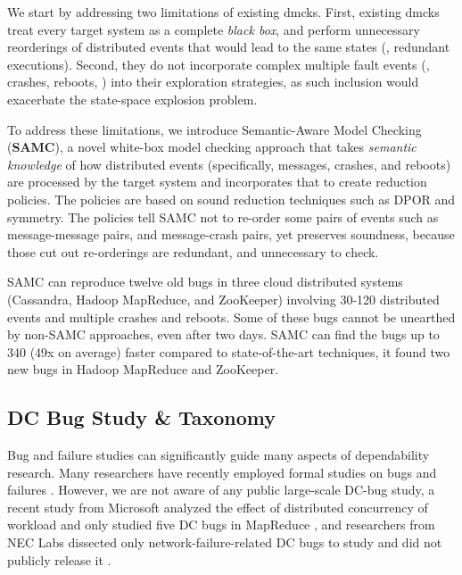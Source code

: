 We start by addressing two limitations of existing dmcks. First, existing dmcks
treat every target system as a complete \textit{black box}, and perform
unnecessary reorderings of distributed events that would lead to the same states
(\ie, redundant executions). Second, they do not incorporate complex multiple
fault events (\eg, crashes, reboots, \etc) into their exploration strategies, as
such inclusion would exacerbate the state-space explosion problem.

To address these limitations, we introduce Semantic-Aware Model Checking
(\textbf{SAMC}), a novel white-box model checking approach that takes
\textit{semantic knowledge} of how distributed events (specifically, messages,
crashes, and reboots) are processed by the target system and incorporates that
to create reduction policies. The policies are based on sound reduction
techniques such as DPOR and symmetry. The policies tell SAMC not to re-order
some pairs of events such as message-message pairs, and message-crash pairs, yet
preserves soundness, because those cut out re-orderings are redundant, and
unnecessary to check.

SAMC can reproduce twelve old bugs in three cloud distributed systems
(Cassandra, Hadoop MapReduce, and ZooKeeper) involving 30-120 distributed events
and multiple crashes and reboots. Some of these bugs cannot be unearthed by
non-SAMC approaches, even after two days. SAMC can find the bugs up to 340 (49x
on average) faster compared to state-of-the-art techniques, it found two new
bugs in Hadoop MapReduce and ZooKeeper.

\subsection{DC Bug Study \& Taxonomy}

Bug and failure studies can significantly guide many aspects of dependability
research. Many researchers have recently employed formal studies on bugs and
failures \cite{Jin+12-PerformanceBugs, Li+13-ScopeBugStudy, Li+07-MemoryErrors,
Lu+08-ConcurrencyBugStudy, Sahoo+10-StudyBugsServerSoftware,
SridharanLiberty12-StudyDRAMFailures, Xiao+14-NonDetMR,
Yin+11-StudyConfErrors}.
%
However, we are not aware of any public large-scale DC-bug study, a recent study
from Microsoft analyzed the effect of distributed concurrency of workload and
only studied five DC bugs in MapReduce \cite{Xiao+14-NonDetMR}, and researchers
from NEC Labs dissected only network-failure-related DC bugs to study and did
not publicly release it \cite{Joshi+13-SetsudoTesting}.

